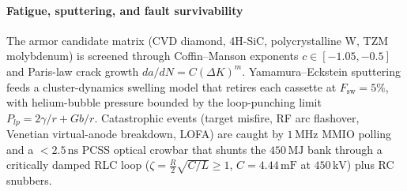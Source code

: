 \documentclass[11pt,journal,compsoc]{IEEEtran}
\begin{document}
\paragraph{Fatigue, sputtering, and fault survivability}
The armor candidate matrix (CVD diamond, 4H-SiC, polycrystalline W,
TZM molybdenum) is screened through Coffin--Manson exponents
$c \in [-1.05, -0.5]$ and Paris-law crack growth
$da/dN = C(\Delta K)^{m}$. Yamamura--Eckstein sputtering feeds a
cluster-dynamics swelling model that retires each cassette at
$F_{\mathrm{sw}} = 5\%$, with helium-bubble pressure bounded by the
loop-punching limit $P_{lp} = 2\gamma/r + Gb/r$. Catastrophic events
(target misfire, RF arc flashover, Venetian virtual-anode breakdown,
LOFA) are caught by $1\,\mathrm{MHz}$ MMIO polling and a $<2.5\,
\mathrm{ns}$ PCSS optical crowbar that shunts the $450\,\mathrm{MJ}$
bank through a critically damped RLC loop
($\zeta = \tfrac{R}{2}\sqrt{C/L} \ge 1$, $C = 4.44\,\mathrm{mF}$ at
$450\,\mathrm{kV}$) plus RC snubbers.
\end{document}

